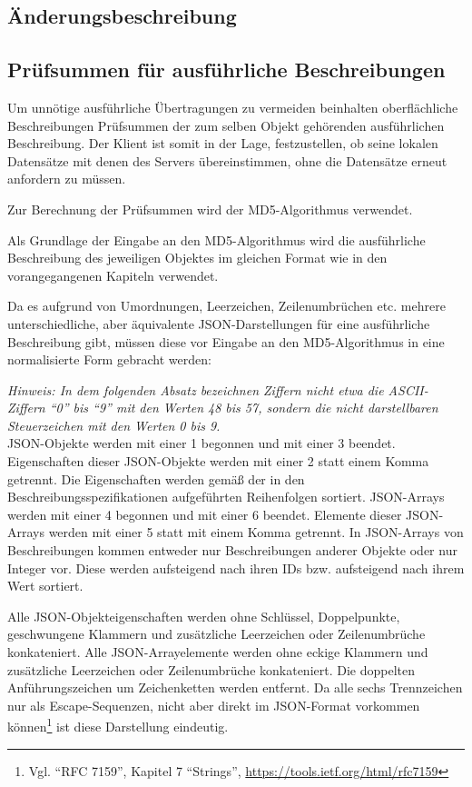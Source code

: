 \documentclass[parskip=full,11pt]{scrartcl}
\begin{document}
\subsection{Änderungsbeschreibung}\label{sec:updatedesc}

\subsection{Prüfsummen für ausführliche Beschreibungen}\label{sec:checksum}
\newcommand{\hashAlg}{MD5}
Um unnötige ausführliche Übertragungen zu vermeiden beinhalten oberflächliche
Beschreibungen Prüfsummen der zum selben Objekt gehörenden ausführlichen
Beschreibung.
Der Klient ist somit in der Lage, festzustellen, ob seine lokalen Datensätze
mit denen des Servers übereinstimmen, ohne die Datensätze erneut anfordern zu
müssen.

\par Zur Berechnung der Prüfsummen wird der \hashAlg-Algorithmus verwendet.

\par Als Grundlage der Eingabe an den \hashAlg-Algorithmus wird die
ausführliche Beschreibung des jeweiligen Objektes im gleichen Format wie in den
vorangegangenen Kapiteln verwendet.

\par Da es aufgrund von Umordnungen, Leerzeichen, Zeilenumbrüchen etc. mehrere
unterschiedliche, aber äquivalente JSON-Darstellungen für eine ausführliche
Beschreibung gibt, müssen diese vor Eingabe an den \hashAlg-Algorithmus in eine
normalisierte Form gebracht werden:

\par \textit{Hinweis: In dem folgenden Absatz bezeichnen Ziffern nicht etwa die
ASCII-Ziffern \enquote{0} bis \enquote{9} mit den Werten 48 bis 57, sondern die
nicht darstellbaren Steuerzeichen mit den Werten 0 bis 9.}\\
JSON-Objekte werden mit einer 1 begonnen und mit einer 3 beendet.
Eigenschaften dieser JSON-Objekte werden mit einer 2 statt einem Komma
getrennt.
Die Eigenschaften werden gemäß der in den Beschreibungsspezifikationen
aufgeführten Reihenfolgen sortiert.
JSON-Arrays werden mit einer 4 begonnen und mit einer 6 beendet.
Elemente dieser JSON-Arrays werden mit einer 5 statt mit einem Komma getrennt.
In JSON-Arrays von Beschreibungen kommen entweder nur Beschreibungen anderer
Objekte oder nur Integer vor.
Diese werden aufsteigend nach ihren IDs bzw. aufsteigend nach ihrem Wert
sortiert.

Alle JSON-Objekteigenschaften werden ohne Schlüssel, Doppelpunkte, geschwungene
Klammern und zusätzliche Leerzeichen oder Zeilenumbrüche konkateniert.
Alle JSON-Arrayelemente werden ohne eckige Klammern und zusätzliche
Leerzeichen oder Zeilenumbrüche konkateniert.
Die doppelten Anführungszeichen um Zeichenketten werden entfernt.
Da alle sechs Trennzeichen nur als Escape-Sequenzen, nicht aber direkt im
JSON-Format vorkommen können\footnote{Vgl. \enquote{RFC 7159}, Kapitel 7
\enquote{Strings}, \url{https://tools.ietf.org/html/rfc7159}} ist diese
Darstellung eindeutig.
\end{document}
